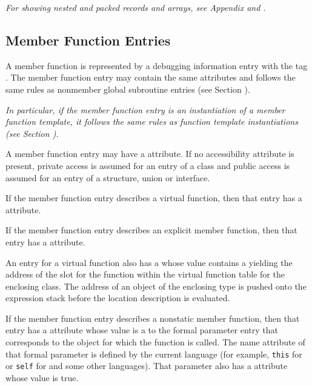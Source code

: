 \textit{For showing nested and packed records and arrays, 
see Appendix  and 
.}


\subsection{Member Function Entries}
\label{chap:memberfunctionentries}

A member function is represented by a 
debugging information entry 
with the 
tag \DWTAGsubprogram.
The member function entry
may contain the same attributes and follows the same rules
as non\dash member global subroutine entries 
(see Section ).

\textit{In particular, if the member function entry is an
instantiation of a member function template, it follows the 
same rules as function template instantiations (see Section 
).
}

A 
member function entry may have a 
\DWATaccessibility{}
attribute. If no accessibility attribute is present, private
access is assumed for an entry of a class and public access
is assumed for an entry of a structure, union or interface.

If 
\hypertarget{chap:DWATvirtualityvirtualityoffunction}{}
the member function entry describes a virtual function,
then that entry has a 
\DWATvirtualityDEFN{} attribute.

If 
\hypertarget{chap:DWATexplicitexplicitpropertyofmemberfunction}{}
the member function entry describes an explicit member
function, then that entry has 
a 
\DWATexplicitDEFN{} attribute.

An 
\hypertarget{chap:DWATvtableelemlocationvirtualfunctiontablevtableslot}{}
entry for a virtual function also has a
\DWATvtableelemlocationDEFN{}
 whose value contains
a  
yielding the address of the slot
for the function within the virtual function table for the
enclosing class. The address of an object of the enclosing
type is pushed onto the expression stack before the location
description is evaluated.

If 
\hypertarget{chap:DWATobjectpointerobjectthisselfpointerofmemberfunction}{}
the member function entry describes a non\dash static member
function, then that entry 
has 
a \DWATobjectpointerDEFN{} attribute
whose value is a  
to the formal parameter entry
that corresponds to the object for which the function is
called. The name attribute of that formal parameter is defined
by the current language (for example, 
\texttt{this} for  or \texttt{self}
for  
and some other languages). That parameter
also has a \DWATartificial{} attribute whose value is true.

